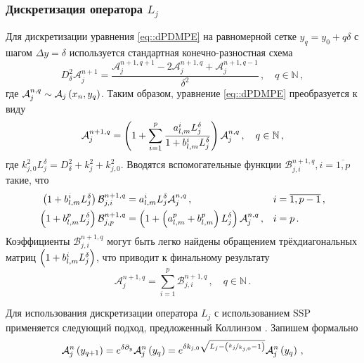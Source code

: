 \documentclass[../document.tex]{subfiles}
\begin{document}
        \subsubsection{Дискретизация оператора $L_j$}
            \par Для дискретизации уравнения \eqref{eq::dPDMPE} на равномерной сетке $y_q=y_0+q\delta$ с шагом $\Delta y=\delta$ используется стандартная конечно-разностная схема
            \begin{equation}
                D_\delta^2\mathcal{A}_j^{n+1}=\frac{\mathcal{A}_j^{n+1,q+1}-2\mathcal{A}_j^{n+1,q}+\mathcal{A}_j^{n+1,q-1}}{\delta^2}\,,\quad q\in\mathbb{N}\,,
            \end{equation}
            где $\mathcal{A}_j^{n,q}\sim\mathcal{A}_j\left(x_n,y_q\right)$. Таким образом, уравнение \eqref{eq::dPDMPE} преобразуется к виду
            \begin{equation}\label{eq::ddPDMPE}
                \mathcal{A}_j^{n+1,q}=\left(1+\sum\limits_{i=1}^p\frac{a_{l,m}^iL_j^\delta}{1+b_{l,m}^iL_j^\delta}\right)\mathcal{A}_j^{n,q}\,,\quad q\in\mathbb{N}\,,
            \end{equation}
            где $k_{j,0}^2L_j^\delta=D_\delta^2+k_j^2+k_{j,0}^2$. Вводятся вспомогательные функции $\mathcal{B}_{j,i}^{n+1,q},i=\overline{1,p}$ такие, что 
            \begin{align}
                \left(1+b_{l,m}^iL_j^\delta\right)\mathcal{B}_{j,i}^{n+1,q}&=a_{l,m}^iL_j^\delta\mathcal{A}_j^{n,q}\,,&&i=\overline{1,p-1}\,,\\
                \left(1+b_{l,m}^pL_j^\delta\right)\mathcal{B}_{j,p}^{n+1,q}&=\left(1+\left(a_{l,m}^p+b_{l,m}^p\right)L_j^\delta\right)\mathcal{A}_j^{n,q}\,,&&i=p\,.
            \end{align}
            Коэффициенты $\mathcal{B}_{j,i}^{n+1,q}$ могут быть легко найдены обращением трёхдиагональных матриц $\left(1+b_{l,m}^iL_j^\delta\right)$, что  приводит к финальному результату
            \begin{equation}
                \mathcal{A}_j^{n+1,q}=\sum\limits_{i=1}^p\mathcal{B}_{j,i}^{n+1,q}\,,\quad q\in\mathbb{N}\,.
            \end{equation}
            \par Для использования дискретизации оператора $L_j$ с использованием SSP применяется следующий подход, предложенный Коллинзом \cite{collins}. Запишем формально 
            \begin{equation}
                \mathcal{A}_j^n\left(y_{q+1}\right)=e^{\delta\partial_y}\mathcal{A}_j^n\left(y_q\right)=e^{\delta k_{j,0}\sqrt{L_j-\left(\nicefrac{k_j}{k_{j,0}}-1\right)}}\mathcal{A}_j^n\left(y_q\right)\,,
            \end{equation}
\end{document}
